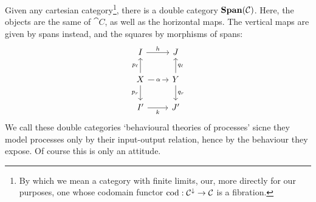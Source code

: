 \begin{example}
\label{ex:behav-processes}
	Given any cartesian category\footnote{By which we mean a category with finite limits, our, more directly for our purposes, one whose codomain functor $\cod:\cat C^\downarrow \to \cat C$ is a fibration.}, there is a double category $\Span(\cat C)$.
	Here, the objects are the same of $\cat C$, as well as the horizontal maps. The vertical maps are given by spans instead, and the squares by morphisms of spans:
	\begin{equation}
		\begin{tikzcd}[ampersand replacement=\&]
			I \& J \\
			X \& Y \\
			{I'} \& {J'}
			\arrow["{p_r}"', from=2-1, to=3-1]
			\arrow["{q_r}", from=2-2, to=3-2]
			\arrow["{p_\ell}", from=2-1, to=1-1]
			\arrow["{q_\ell}"', from=2-2, to=1-2]
			\arrow["\alpha"{description}, from=2-1, to=2-2]
			\arrow["k"', from=3-1, to=3-2]
			\arrow["h", from=1-1, to=1-2]
		\end{tikzcd}
	\end{equation}
	We call these double categories `behavioural theories of processes' sicne they model processes only by their input-output relation, hence by the behaviour they expose. Of course this is only an attitude.
\end{example}
